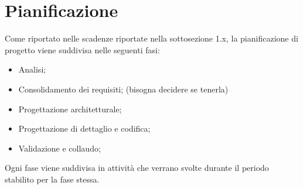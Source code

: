 \section{Pianificazione}
Come riportato nelle scadenze riportate nella sottosezione 1.x, la pianificazione di progetto viene suddivisa nelle seguenti fasi:
\begin{itemize}
	\item Analisi;
	\item Consolidamento dei requisiti; (bisogna decidere se tenerla)
	\item Progettazione architetturale;
	\item Progettazione di dettaglio e codifica;
	\item Validazione e collaudo;
\end{itemize}
Ogni fase viene suddivisa in attività che verrano svolte durante il periodo stabilito per la fase stessa.





